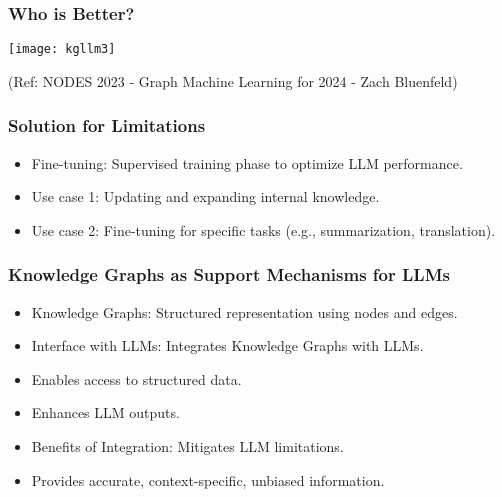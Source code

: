 \begin{frame}[fragile]\frametitle{Who is Better?}

\begin{center}
\texttt{[image: kgllm3]}
\end{center}	

{\tiny (Ref: NODES 2023 - Graph Machine Learning for 2024 - Zach Bluenfeld)}
\end{frame}


\begin{frame}[fragile]\frametitle{Solution for Limitations}

\begin{itemize}
\item Fine-tuning: Supervised training phase to optimize LLM performance.
\item Use case 1: Updating and expanding internal knowledge.
\item Use case 2: Fine-tuning for specific tasks (e.g., summarization, translation).
\end{itemize}	

\end{frame}


\begin{frame}[fragile]\frametitle{Knowledge Graphs as Support Mechanisms for LLMs}

\begin{itemize}
\item Knowledge Graphs: Structured representation using nodes and edges.
\item Interface with LLMs: Integrates Knowledge Graphs with LLMs.
\item Enables access to structured data.
\item Enhances LLM outputs.
\item Benefits of Integration: Mitigates LLM limitations.
\item Provides accurate, context-specific, unbiased information.
\end{itemize}	

\end{frame}




